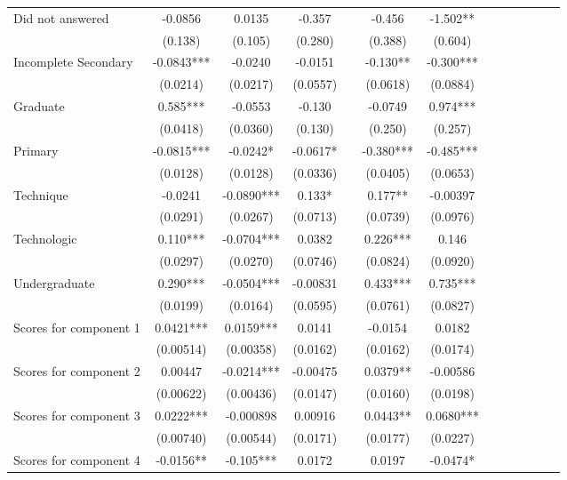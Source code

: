 \documentclass[]{article}
\begin{document}
\begin{tabular}{lcccccccccccc}
Did not answered & -0.0856 & 0.0135 & -0.357 &  & -0.456 & -1.502** &  &  &  &  &  &  \\
 & (0.138) & (0.105) & (0.280) &  & (0.388) & (0.604) &  &  &  &  &  &  \\
Incomplete Secondary & -0.0843*** & -0.0240 & -0.0151 &  & -0.130** & -0.300*** &  &  &  &  &  &  \\
 & (0.0214) & (0.0217) & (0.0557) &  & (0.0618) & (0.0884) &  &  &  &  &  &  \\
Graduate & 0.585*** & -0.0553 & -0.130 &  & -0.0749 & 0.974*** &  &  &  &  &  &  \\
 & (0.0418) & (0.0360) & (0.130) &  & (0.250) & (0.257) &  &  &  &  &  &  \\
Primary & -0.0815*** & -0.0242* & -0.0617* &  & -0.380*** & -0.485*** &  &  &  &  &  &  \\
 & (0.0128) & (0.0128) & (0.0336) &  & (0.0405) & (0.0653) &  &  &  &  &  &  \\
Technique & -0.0241 & -0.0890*** & 0.133* &  & 0.177** & -0.00397 &  &  &  &  &  &  \\
 & (0.0291) & (0.0267) & (0.0713) &  & (0.0739) & (0.0976) &  &  &  &  &  &  \\
Technologic & 0.110*** & -0.0704*** & 0.0382 &  & 0.226*** & 0.146 &  &  &  &  &  &  \\
 & (0.0297) & (0.0270) & (0.0746) &  & (0.0824) & (0.0920) &  &  &  &  &  &  \\
Undergraduate & 0.290*** & -0.0504*** & -0.00831 &  & 0.433*** & 0.735*** &  &  &  &  &  &  \\
 & (0.0199) & (0.0164) & (0.0595) &  & (0.0761) & (0.0827) &  &  &  &  &  &  \\
Scores for component 1 & 0.0421*** & 0.0159*** & 0.0141 &  & -0.0154 & 0.0182 &  &  &  &  &  &  \\
 & (0.00514) & (0.00358) & (0.0162) &  & (0.0162) & (0.0174) &  &  &  &  &  &  \\
Scores for component 2 & 0.00447 & -0.0214*** & -0.00475 &  & 0.0379** & -0.00586 &  &  &  &  &  &  \\
 & (0.00622) & (0.00436) & (0.0147) &  & (0.0160) & (0.0198) &  &  &  &  &  &  \\
Scores for component 3 & 0.0222*** & -0.000898 & 0.00916 &  & 0.0443** & 0.0680*** &  &  &  &  &  &  \\
 & (0.00740) & (0.00544) & (0.0171) &  & (0.0177) & (0.0227) &  &  &  &  &  &  \\
Scores for component 4 & -0.0156** & -0.105*** & 0.0172 &  & 0.0197 & -0.0474* &  &  &  &  &  &  \\

\end{tabular}
\end{document}
